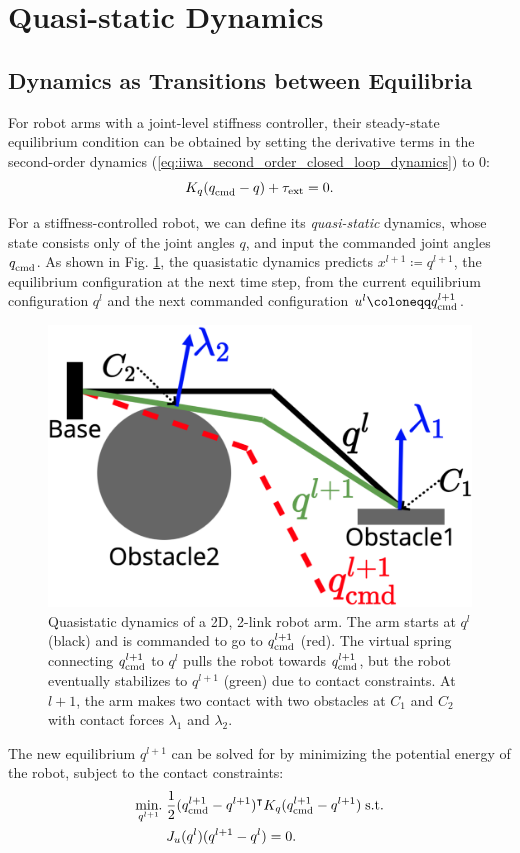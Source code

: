 \section{Quasi-static Dynamics}
\subsection{Dynamics as Transitions between Equilibria \label{sec:quasistatic_dynamics_1}}
For robot arms with a joint-level stiffness controller, their steady-state equilibrium condition can be obtained by setting the derivative terms in the second-order dynamics (\ref{eq:iiwa_second_order_closed_loop_dynamics}) to 0:
\begin{equation}
\label{eq:quaistatic_force_balance}
K_q (\qcmd - q) + \tauE = 0. 
\end{equation}

For a stiffness-controlled robot, we can define its \textit{quasi-static} dynamics, whose state consists only of the joint angles $q$, and input the commanded joint angles $\qcmd$. As shown in Fig. \ref{fig:quasistatic_dynamics}, the quasistatic dynamics predicts $x^{l+1} \coloneqq q^{l+1}$, the equilibrium configuration at the next time step, from the current equilibrium configuration $q^{l}$ and the next commanded configuration $u^l \coloneqq \qcmd[l+1]$.
\begin{figure}[h]
\vspace{-0.3cm}
\centering
\includegraphics[width=0.45\linewidth]{figures/04_control/quasistatic_dynamics.png}
\caption{Quasistatic dynamics of a 2D, 2-link robot arm. The arm starts at $q^l$ (black) and is commanded to go to $\qcmd[l+1]$ (red). The virtual spring connecting $\qcmd[l+1]$ to $q^l$ pulls the robot towards $\qcmd[l+1]$, but the robot eventually stabilizes to $q^{l+1}$ (green) due to contact constraints. At $l+1$, the arm makes two contact with two obstacles at $C_1$ and $C_2$ with contact forces $\lambda_1$ and $\lambda_2$.}
\label{fig:quasistatic_dynamics}
\vspace{-0.3cm}
\end{figure}

The new equilibrium $q^{l+1}$ can be solved for by minimizing the potential energy of the robot, subject to the contact constraints:
\begin{subequations}

\label{eq:quasistatic_dynamics_qp}
\begin{align}
\underset{q^{l+1}}{\text{min.}} \; &\frac{1}{2}(\qcmd[l+1] - q^{l+1})^\intercal K_q (\qcmd[l+1] - q^{l+1}) \; \text{s.t.} \\
& J_u(q^l) (q^{l+1} - q^{l}) = 0. \label{eq:quasistatic_dynamics_qp:equality_constraint}
\end{align}
\end{subequations}

